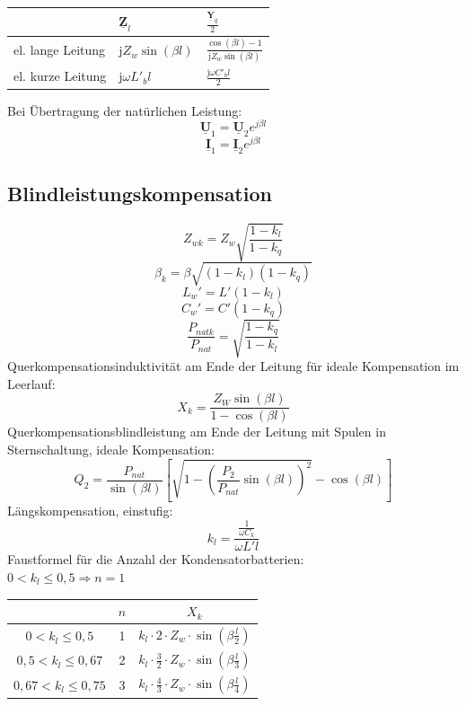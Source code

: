 \documentclass[9pt,a4paper]{scrartcl}
\renewcommand{\vec}[1]{\ensuremath{\underline{\boldsymbol {#1}}}}
\renewcommand{\i}{\ensuremath{\mathrm{j}}}										%
\begin{document}
\begin{multicols}{3}
		\begin{tabular}{lll}
		& $\vec Z_l$ & $\frac{\vec Y_q}{2}$\\[0.5em] \midrule
		el. lange Leitung & $\i Z_w \sin(\beta l)$ & $\frac{\cos(\beta l) -1}{\i Z_w \sin(\beta l)}$\\[0.5em]
		el. kurze Leitung & $\i \omega L'_b l$ & $\frac{\i \omega C'_b l}{2}$\\[0.5em]
		\end{tabular}		
		
		Bei Übertragung der natürlichen Leistung:
		\[\vec U_1 = \vec U_2 e^{j \beta l}\]
		\[\vec I_1 = \vec I_2 e^{j \beta l}\]
		
		\subsection{Blindleistungskompensation}
		\[Z_{wk} = Z_w \sqrt{\frac{1 - k_l}{1 - k_q}}\]
		\[\beta_k = \beta \sqrt{(1 - k_l)(1 - k_q)}\]		
		\[L_w' = L' (1 - k_l)\]
		\[C_w' = C' (1 - k_q)\]		
		\[\frac{P_{natk}}{P_{nat}} = \sqrt{\frac{1 - k_q}{1 - k_l}}\]
		Querkompensationsinduktivität am Ende der Leitung für ideale Kompensation im Leerlauf:
		\[X_k = \frac{Z_W \sin (\beta l)}{1 - \cos (\beta l)}\]
		Querkompensationsblindleistung am Ende der Leitung mit Spulen in Sternschaltung, ideale Kompensation:
		\[Q_2 = \frac{P_{nat}}{\sin (\beta l)} \left[ \sqrt{1 - \left( \frac{P_2}{P_{nat}} \sin (\beta l) \right)^2} - \cos (\beta l)\right] \]		
		Längskompensation, einstufig:
		\[k_l = \frac{\frac{1}{\omega C_k}}{\omega L' l}\]
		Faustformel für die Anzahl der Kondensatorbatterien: \\
		$0 < k_l \le 0,5 \Rightarrow n = 1$
		
		\begin{tabular}{c|c|c}
		& $n$ & $X_k$ \\ \hline
		$0 < k_l \le 0,5$ & 1 & $k_l \cdot 2 \cdot Z_w \cdot \sin (\beta \frac{l}{2})$ \\ \hline
		$0,5 < k_l \le 0,67$ & 2 & $k_l \cdot \frac{3}{2} \cdot Z_w \cdot \sin (\beta \frac{l}{3})$ \\ \hline
		$0,67 < k_l \le 0,75$ & 3 & $k_l \cdot \frac{4}{3} \cdot Z_w \cdot \sin (\beta \frac{l}{4})$
		\end{tabular}
		

\end{multicols}
\end{document}
